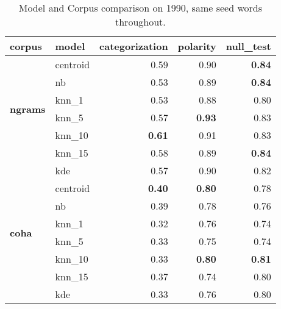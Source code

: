 \documentclass{article}
\begin{document}
\begin{table}
    \centering
    \caption{Model and Corpus comparison on 1990, same seed words throughout.}
    \begin{tabular}{llrrr}
        \toprule
        \bfseries corpus &     \bfseries model &  \bfseries categorization &  \bfseries polarity &  \bfseries null\_test \\
        \midrule
        \multirow{6}{*}{\bfseries ngrams} &  centroid &                       0.59 &               0.90 & \bfseries  0.84 \\
                                          &        nb &                       0.53 &               0.89 & \bfseries  0.84 \\
                                          &     knn\_1 &                      0.53 &               0.88 &            0.80 \\
                                          &     knn\_5 &                      0.57 &   \bfseries   0.93 &            0.83 \\
                                          &    knn\_10 &            \bfseries 0.61 &               0.91 &            0.83 \\
                                          &    knn\_15 &                      0.58 &               0.89 & \bfseries  0.84 \\
                                          &        kde &                      0.57 &               0.90 &            0.82 \\
        \midrule
        \multirow{6}{*}{\bfseries coha} &  centroid &               \bfseries 0.40 &   \bfseries   0.80 &            0.78 \\
                                        &        nb &                         0.39 &               0.78 &            0.76 \\
                                        &     knn\_1 &                        0.32 &               0.76 &            0.74 \\
                                        &     knn\_5 &                        0.33 &               0.75 &            0.74 \\
                                        &    knn\_10 &                        0.33 &   \bfseries   0.80 & \bfseries  0.81 \\
                                        &    knn\_15 &                        0.37 &               0.74 &            0.80 \\
                                        &        kde &                        0.33 &               0.76 &            0.80 \\

\end{tabular}
\end{table}
\end{document}
